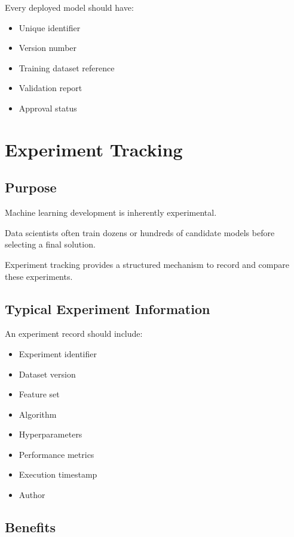 Every deployed model should have:

\begin{itemize}
    \item Unique identifier
    \item Version number
    \item Training dataset reference
    \item Validation report
    \item Approval status
\end{itemize}

\section{Experiment Tracking}

\subsection{Purpose}

Machine learning development is inherently experimental.

Data scientists often train dozens or hundreds of candidate models before selecting a final solution.

Experiment tracking provides a structured mechanism to record and compare these experiments.

\subsection{Typical Experiment Information}

An experiment record should include:

\begin{itemize}
    \item Experiment identifier
    \item Dataset version
    \item Feature set
    \item Algorithm
    \item Hyperparameters
    \item Performance metrics
    \item Execution timestamp
    \item Author
\end{itemize}

\subsection{Benefits}

